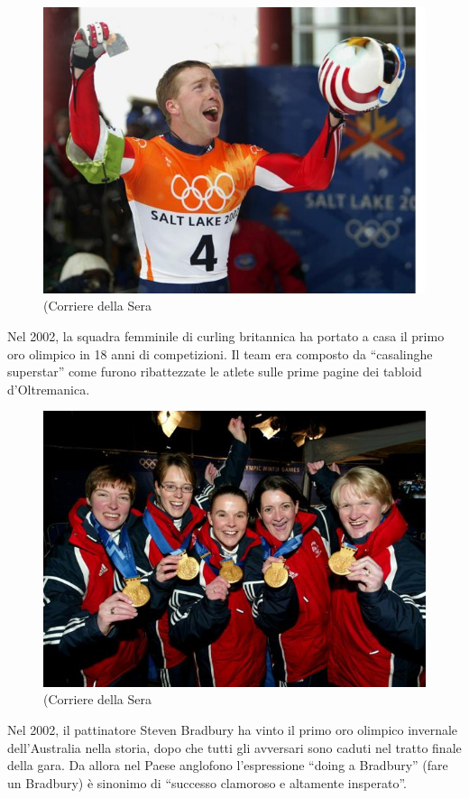 \documentclass[
]{book}
\begin{document}
\begin{figure}
\includegraphics[width=0.8\linewidth]{images/corriere/2002} \caption{(Corriere della Sera}\label{fig:unnamed-chunk-71}
\end{figure}

Nel 2002, la squadra femminile di curling britannica ha portato a casa il primo oro olimpico in 18 anni di competizioni. Il team era composto da ``casalinghe superstar'' come furono ribattezzate le atlete sulle prime pagine dei tabloid d'Oltremanica.

\begin{figure}
\includegraphics[width=0.8\linewidth]{images/corriere/2002(2)} \caption{(Corriere della Sera}\label{fig:unnamed-chunk-72}
\end{figure}

Nel 2002, il pattinatore Steven Bradbury ha vinto il primo oro olimpico invernale dell'Australia nella storia, dopo che tutti gli avversari sono caduti nel tratto finale della gara. Da allora nel Paese anglofono l'espressione ``doing a Bradbury'' (fare un Bradbury) è sinonimo di ``successo clamoroso e altamente insperato''.
\end{document}
